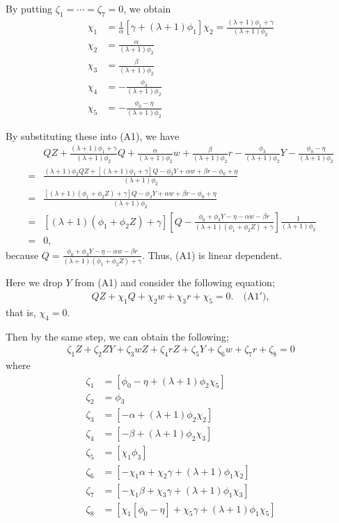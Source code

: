 \documentclass[11pt, a4paper]{article}
\begin{document}
By putting $\zeta_1 = \cdots = \zeta_7 =0$, we obtain 
\begin{align*}
        \chi_1 &= \frac{1}{\alpha}[\gamma+(\lambda+1)\phi_1 ]\chi_2=\frac{(\lambda + 1)\phi_1 + \gamma}{(\lambda + 1)\phi_2}\\
        \chi_2 &= \frac{\alpha}{(\lambda + 1)\phi_2}\\
        \chi_3 &= \frac{\beta}{(\lambda + 1)\phi_2}\\
        \chi_4 &= -\frac{\phi_3}{(\lambda + 1)\phi_2}\\
        \chi_5 &= -\frac{\phi_0 - \eta}{(\lambda + 1)\phi_2}
\end{align*}

By substituting these into (A1),  we have
\begin{align*}
    &QZ + \frac{(\lambda + 1)\phi_1 + \gamma}{(\lambda + 1)\phi_2}Q +  \frac{\alpha}{(\lambda + 1)\phi_2} w +  \frac{\beta}{(\lambda + 1)\phi_2}r -\frac{\phi_3}{(\lambda + 1)\phi_2}Y -\frac{\phi_0 - \eta}{(\lambda + 1)\phi_2} \\
    =&\frac{ (\lambda + 1)\phi_2QZ + [(\lambda + 1)\phi_1 + \gamma]Q  -\phi_3 Y + \alpha w + \beta r - \phi_0 + \eta}{(\lambda + 1)\phi_2}\\
    =& \frac{[(\lambda + 1)(\phi_1 + \phi_2 Z) + \gamma]Q  -\phi_3 Y + \alpha w + \beta r - \phi_0 + \eta}{(\lambda + 1)\phi_2}\\
    =& [(\lambda + 1)(\phi_1 + \phi_2 Z) + \gamma]\left[ Q - \frac{\phi_0 + \phi_3 Y - \eta- \alpha w - \beta r}{(\lambda + 1)(\phi_1 + \phi_2 Z) + \gamma}\right]\frac{1}{(\lambda + 1)\phi_2}\\
    =& 0,
\end{align*}
because $Q = \frac{\phi_0 + \phi_3Y -\eta - \alpha w -  \beta r}{(\lambda + 1) (\phi_1 + \phi_2 Z) + \gamma}$. 
Thus, (A1) is linear dependent.

Here we drop $Y$ from (A1) and consider the following equation;
\begin{align*}
    QZ + \chi_1 Q + \chi_2 w + \chi_3 r + \chi_5 = 0.\quad \text{(A1$'$)},
\end{align*}
that is, $\chi_4=0$. 

Then by the same step, we can obtain the following;
\begin{align*}
    \zeta_1 Z + \zeta_2 ZY + \zeta_3 wZ + \zeta_4 rZ + \zeta_5 Y + \zeta_6 w + \zeta_7 r + \zeta_8 = 0 
\end{align*}
where
\begin{align*}
    \zeta_1 &= [\phi_0-\eta+(\lambda + 1)\phi_2 \chi_5]\\
    \zeta_2 &= \phi_3\\
    \zeta_3 &= [-\alpha+(\lambda + 1)\phi_2 \chi_2]\\
    \zeta_4 &= [-\beta+(\lambda + 1)\phi_2  \chi_3]\\
    \zeta_5 &= [\chi_1 \phi_3]\\
    \zeta_6 &= [-\chi_1\alpha+\chi_2\gamma+(\lambda+1)\phi_1 \chi_2 ]\\
    \zeta_7 &= [-\chi_1\beta+\chi_3 \gamma+(\lambda+1)\phi_1 \chi_3]\\
    \zeta_8 &= [\chi_1 [\phi_0 -\eta]+\chi_5\gamma+(\lambda+1)\phi_1 \chi_5]
\end{align*}
\end{document}
